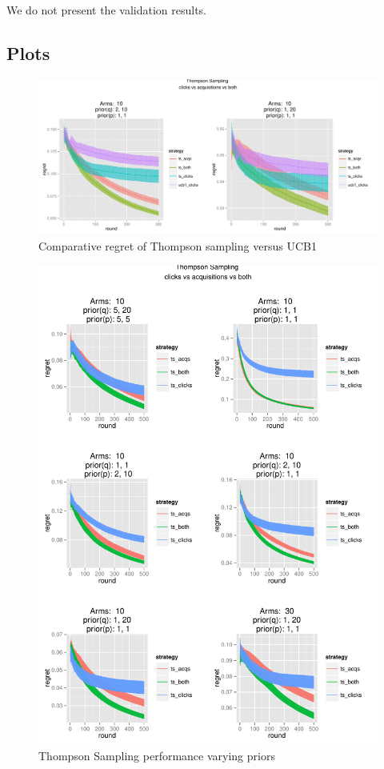 \documentclass[11pt,a4,singlespacing,titlepagenumber=on]{scrreprt}
\numberwithin{equation}{chapter} %
\theoremstyle{remark}
\begin{document}
We do not present the validation results.

\subsection{Plots}

\begin{figure}[H]
    \centering
    \includegraphics[scale=0.5]{P4to5UCB}
    \caption{Comparative regret of Thompson sampling versus UCB1}
\end{figure}

\begin{figure}[H]
    \centering
    \includegraphics[scale=0.7]{P1to6.pdf}
    \caption{ Thompson Sampling performance varying priors }
\end{figure}
\end{document}

